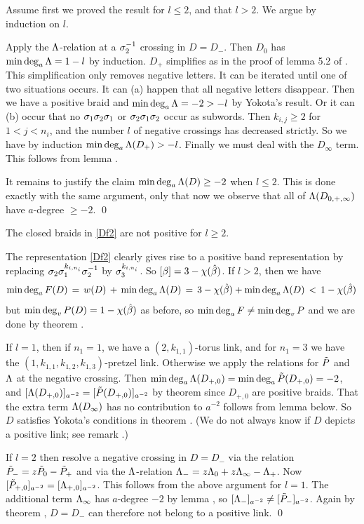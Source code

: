 \proof Assume first we proved the result for $l\le 2$, and that
$l>2$. We argue by induction on $l$.

Apply the $\Lambda$-relation at a $\sigma_2^{-1}$ crossing in $D=D_-$.
Then $D_0$ has $\min\deg_a\Lambda=1-l$ by induction. $D_+$ simplifies
as in the proof of lemma 5.2 of \cite{ntriv}. This simplification
only removes negative letters. It can be iterated until one
of two situations occurs. It can (a) happen that all negative
letters disappear. Then we have a positive braid and $\min\deg_a\Lambda=-2>-l$
by Yokota's result. Or it can (b) occur that no $\sigma_1\sigma_2\sigma_1$
or $\sigma_2\sigma_1\sigma_2$ occur as subwords. Then $k_{i,j}\ge 2$
for $1<j<n_i$, and the number $l$ of negative crossings has
decreased strictly. So we have by induction $\min\deg_a\Lambda(D_+)>-l$.
Finally we must deal with the $D_\infty$ term. This follows
from lemma .

It remains to justify the claim $\min\deg_a\Lambda(D)\ge -2$ when $l\le 2$.
This is done exactly with the same argument, only that now we
observe that all of $\Lambda(D_{0,+,\infty})$ have $a$-degree $\ge -2$. \qed

\begin{lemma}\label{lemma3}
The closed braids in \eqref{Df2} are not positive for $l\ge 2$.
\end{lemma}

\proof The representation \eqref{Df2} clearly gives rise to
a positive band representation by replacing $\sigma_2\sigma_1^{k_{i,n_i}}
\sigma_2^{-1}$ by $\sigma_3^{k_{i,n_i}}$. So $[\beta]=3-\chi(\hat{\beta})$.
If $l>2$, then we have
\[
\min\deg_a F(D)\,=\,w(D)\,+\,\min\deg_a \Lambda(D)\,=\,3-\chi(\hat{\beta})+\min\deg_a \Lambda(D)\,
<\,1-\chi(\hat{\beta})\,
\]
but $\min\deg_v P(D)=1-\chi(\hat{\beta})$ as before, so $\min\deg_a F\ne \min\deg_v P$
and we are done by theorem .

If $l=1$, then if $n_1=1$, we have a $(2,k_{1,1})$-torus
link, and for $n_1=3$ we have the $(1,k_{1,1},k_{1,2},k_{1,3})
$-pretzel link. Otherwise we apply the relations for $\tilde P$
and $\Lambda$ at the negative crossing. Then $\min\deg_a\Lambda(D_{+,0})=
\min\deg_a\tilde P(D_{+,0})=-2$, and
$[\Lambda(D_{+,0})]_{a^{-2}}=[\tilde P(D_{+,0})]_{a^{-2}}$
by theorem  since $D_{+,0}$ are positive braids.
That the extra term $\Lambda(D_\infty)$ has no contribution to
$a^{-2}$ follows from lemma  below. So
$D$ satisfies Yokota's conditions in theorem .
(We do not always know if $D$ depicts a positive link; see
remark .)

If $l=2$ then resolve a negative crossing in $D=D_-$ via the
relation $\tilde P_-=z \tilde P_0-\tilde P_+$ and via the $\Lambda$-relation
$\Lambda_-=z\Lambda_0+z\Lambda_\infty-\Lambda_+$. Now $[\tilde P_{+,0}]_{a^{-2}}=
[\Lambda_{+,0}]_{a^{-2}}$. This follows from the above argument
for $l=1$. The additional term $\Lambda_\infty$ has $a$-degree
$-2$ by lemma , so $[\Lambda_-]_{a^{-2}}\ne
[\tilde P_-]_{a^{-2}}$. Again by theorem ,
$D=D_-$ can therefore not belong to a positive link.  \qed

